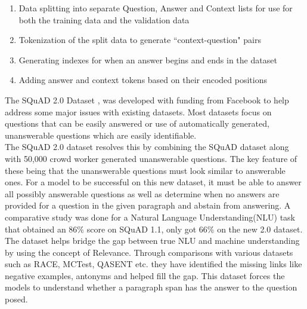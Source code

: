 \documentclass[a4paper,12pt]{report}
\begin{document}
	    \begin{enumerate}
	    	\item Data splitting into separate Question, Answer and Context lists for use for both the training data and the validation data
	    	\item Tokenization of the split data to generate ``context-question" pairs
	    	\item Generating indexes for when an answer begins and ends in the dataset
	    	\item Adding answer and context tokens based on their encoded positions
	    \end{enumerate}

        The SQuAD 2.0 Dataset \citep{dataset}, was developed with funding from Facebook to help address some major issues with existing datasets. Most datasets focus on questions that can be easily answered or use of    automatically generated, unanswerable questions which are easily identifiable.\\
        The SQuAD 2.0 dataset resolves this by combining the SQuAD dataset along with 50,000 crowd worker generated unanswerable questions. The key feature of these being that the unanswerable questions must look similar to answerable ones. For a model to be successful on this new dataset, it must be able to answer all possibly answerable questions as well as determine when no answers are provided for a question in the given paragraph and abstain from answering. A comparative study was done for a Natural Language Understanding(NLU) task that obtained an 86\% score on SQuAD 1.1, only got 66\% on the new 2.0 dataset.
        The dataset helps bridge the gap between true NLU and machine understanding by using the concept of Relevance. Through comparisons with various datasets such as RACE, MCTest, QASENT etc. they have identified the missing links like negative examples, antonyms and helped fill the gap. This dataset forces the models to understand whether a paragraph span has the answer to the question posed.
\end{document}
